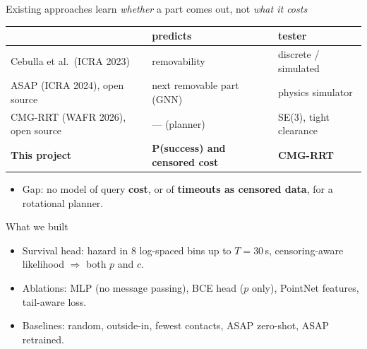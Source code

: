 \documentclass[aspectratio=169,11pt]{beamer}
\begin{document}
\begin{frame}{Existing approaches learn \emph{whether} a part comes out, not \emph{what it costs}}
\begin{center}\footnotesize
\begin{tabular}{lll}
\toprule
& predicts & tester \\
\midrule
Cebulla et al.\ (ICRA 2023) & removability & discrete / simulated \\
ASAP (ICRA 2024), open source & next removable part (GNN) & physics simulator \\
CMG-RRT (WAFR 2026), open source & --- (planner) & SE(3), tight clearance \\
\textbf{This project} & \textbf{P(success) and censored cost} & \textbf{CMG-RRT} \\
\bottomrule
\end{tabular}
\end{center}
\begin{itemize}
\item Gap: no model of query \textbf{cost}, or of \textbf{timeouts as censored data}, for a rotational planner.
\end{itemize}
\end{frame}

\begin{frame}{What we built}
\centering
{}
\vspace{0.4cm}
\begin{itemize}\small
\item Survival head: hazard in 8 log-spaced bins up to $T=30$\,s, censoring-aware likelihood $\Rightarrow$ both $p$ and $c$.
\item Ablations: MLP (no message passing), BCE head ($p$ only), PointNet features, tail-aware loss.
\item Baselines: random, outside-in, fewest contacts, ASAP zero-shot, ASAP retrained.
\end{itemize}
\end{frame}
\end{document}
